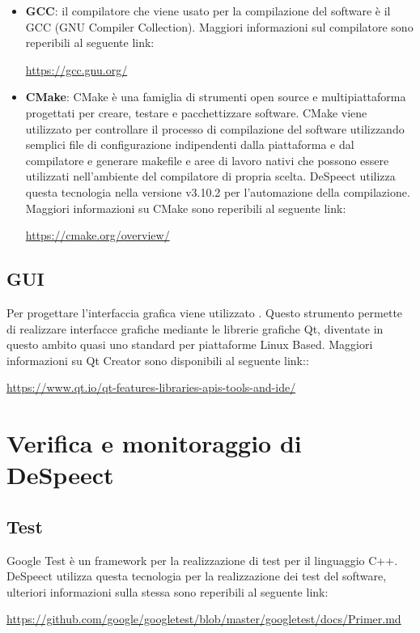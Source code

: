 \documentclass[openany,12pt,a4paper]{report}
\begin{document}
	\begin{itemize}
	\item \textbf{GCC}: il compilatore che viene usato per la compilazione del software è il GCC (GNU Compiler Collection). Maggiori informazioni sul compilatore sono reperibili al seguente link:
	\begin{center}
		\centerline{\url{https://gcc.gnu.org/}}
	\end{center}
	
	\item \textbf{CMake}: CMake è una famiglia di strumenti open source e multipiattaforma progettati per creare, testare e pacchettizzare software. CMake viene utilizzato per controllare il processo di compilazione del software utilizzando semplici file di configurazione indipendenti dalla piattaforma e dal compilatore e generare makefile e aree di lavoro nativi che possono essere utilizzati nell'ambiente del compilatore di propria scelta. DeSpeect utilizza questa tecnologia nella versione v3.10.2 per l’automazione della compilazione. Maggiori informazioni su CMake sono reperibili al seguente link:
	\begin{center}
		\centerline{\url{https://cmake.org/overview/}}
	\end{center}
	
	\end{itemize}
	
	\subsection{GUI}
	
	Per progettare l'interfaccia grafica viene utilizzato . Questo strumento permette di realizzare interfacce grafiche mediante le librerie grafiche Qt, diventate in questo ambito quasi uno standard per piattaforme Linux Based.  Maggiori informazioni su Qt Creator sono disponibili al seguente link:: 
	\begin{center}
	\centerline{\url{https://www.qt.io/qt-features-libraries-apis-tools-and-ide/}}
	\end{center}

	
	\section{Verifica e monitoraggio di DeSpeect}	
	
	\subsection{Test}
	Google Test è un framework per la realizzazione di test per il linguaggio C++. DeSpeect utilizza questa tecnologia per la realizzazione dei test del software, ulteriori informazioni sulla stessa sono reperibili al seguente link:
	\begin{center}
		\url{https://github.com/google/googletest/blob/master/googletest/docs/Primer.md}
	\end{center}
\end{document}

